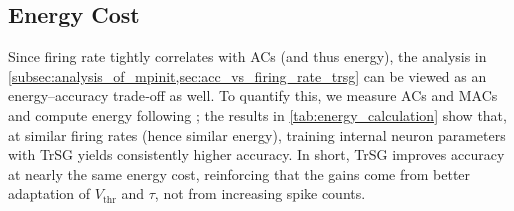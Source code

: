 \subsection{Energy Cost}
Since firing rate tightly correlates with ACs (and thus energy), the analysis in \cref{subsec:analysis_of_mpinit,sec:acc_vs_firing_rate_trsg} can be viewed as an energy–accuracy trade‑off as well.
To quantify this, we measure ACs and MACs and compute energy following \cite{energy}; the results in \cref{tab:energy_calculation} show that, at similar firing rates (hence similar energy), training internal neuron parameters with TrSG yields consistently higher accuracy.
In short, TrSG improves accuracy at nearly the same energy cost, reinforcing that the gains come from better adaptation of $V_{\text{thr}}$ and $\tau$, not from increasing spike counts.


